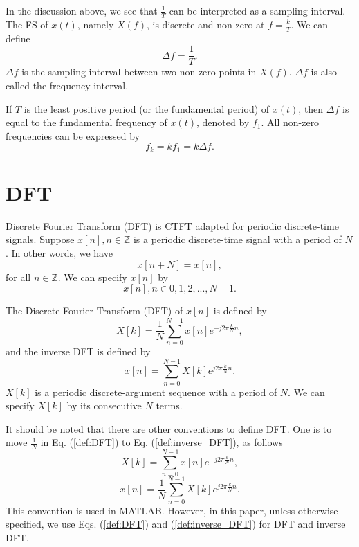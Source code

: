 \documentclass[journal,twoside]{IEEEtran}
\begin{document}
In the discussion above, we see that $\frac{1}{T}$ can be interpreted as a sampling interval. The FS of $x(t)$, namely $X(f)$, is discrete and non-zero at $f = \frac{k}{T}$. We can define
\begin{equation}
\Delta f = \frac{1}{T}.
\end{equation}
$\Delta f$ is the sampling interval between two non-zero points in $X(f)$. $\Delta f$ is also called the frequency interval.

If $T$ is the least positive period (or the fundamental period) of $x(t)$, then $\Delta f$ is equal to the fundamental frequency of $x(t)$, denoted by $f_1$. All non-zero frequencies can be expressed by
\begin{equation}
f_{k} = k f_1 = k \Delta f.
\end{equation}

\section{DFT}
\label{sec:DFT}

Discrete Fourier Transform (DFT) is CTFT adapted for periodic discrete-time signals. Suppose $x[n], n \in \mathbb{Z}$ is a periodic discrete-time signal with a period of $N$. In other words, we have
\begin{equation}
x[n+N]=x[n],
\end{equation}
for all $n \in \mathbb{Z}$. We can specify $x[n]$ by
\begin{equation}
x[n], n \in {0, 1, 2, ..., N-1}.
\end{equation}

The Discrete Fourier Transform (DFT) of $x[n]$ is defined by \cite{ref:Bracewell}
\begin{equation}
X[k] = \frac{1}{N}\sum_{n=0}^{N-1}x[n]e^{-j 2\pi \frac{k}{N} n},\label{def:DFT}
\end{equation}
and the inverse DFT is defined by
\begin{equation}
x[n] = \sum_{n=0}^{N-1}X[k]e^{j 2\pi \frac{k}{N} n}.\label{def:inverse_DFT}
\end{equation}
$X[k]$ is a periodic discrete-argument sequence with a period of $N$. We can specify $X[k]$ by its consecutive $N$ terms.

It should be noted that there are other conventions to define DFT. One is to move $\frac{1}{N}$ in Eq. (\ref{def:DFT}) to Eq. (\ref{def:inverse_DFT}), as follows
\begin{equation}
X[k] = \sum_{n=0}^{N-1}x[n]e^{-j 2\pi \frac{k}{N} n},\label{def:DFT_conv2}
\end{equation}
\begin{equation}
x[n] = \frac{1}{N}\sum_{n=0}^{N-1}X[k]e^{j 2\pi \frac{k}{N} n}.\label{def:inverse_DFT_conv2}
\end{equation}
This convention is used in MATLAB. However, in this paper, unless otherwise specified, we use Eqs. (\ref{def:DFT}) and (\ref{def:inverse_DFT}) for DFT and inverse DFT.
\end{document}
